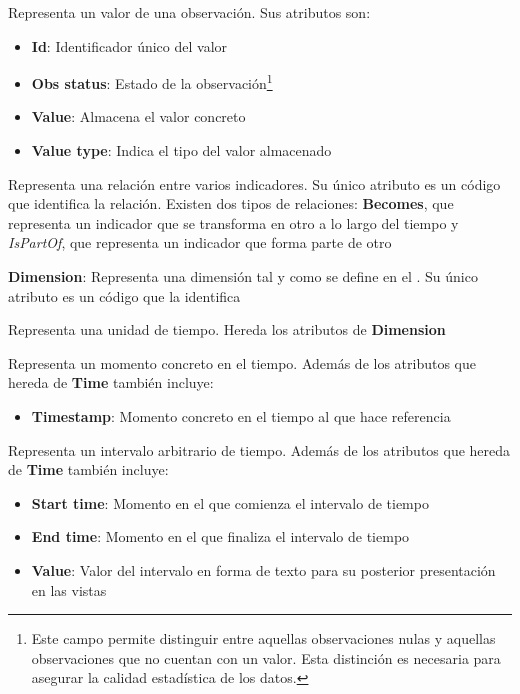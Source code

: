 \begin{description}
\begin{itemize}
		\end{itemize}
	\item[Value]  Representa un valor de una observación.  Sus atributos son:
		\begin{itemize}
			\item \textbf{Id}:  Identificador único del valor
			\item \textbf{Obs status}:  Estado de la observación\footnote{Este campo permite distinguir entre aquellas observaciones nulas y aquellas observaciones que no cuentan con un valor.  Esta distinción es necesaria para asegurar la calidad estadística de los datos.}
			\item \textbf{Value}:  Almacena el valor concreto
			\item \textbf{Value type}:  Indica el tipo del valor almacenado
		\end{itemize}
	\item[IndicatorRelationship]  Representa una relación entre varios indicadores.  Su único atributo es un código que identifica la relación.  Existen dos tipos de relaciones:  \textbf{Becomes}, que representa un indicador que se transforma en otro a lo largo del tiempo y \textit{IsPartOf}, que representa un indicador que forma parte de otro
	\item \textbf{Dimension}:  Representa una dimensión tal y como se define en el .  Su único atributo es un código que la identifica
	\item[Time]  Representa una unidad de tiempo.  Hereda los atributos de \textbf{Dimension}
	\item[Instant]  Representa un momento concreto en el tiempo.  Además de los atributos que hereda de \textbf{Time} también incluye:
	\begin{itemize}
		\item \textbf{Timestamp}:  Momento concreto en el tiempo al que hace referencia
	\end{itemize}
	\item[Interval]  Representa un intervalo arbitrario de tiempo.  Además de los atributos que hereda de \textbf{Time} también incluye:
	\begin{itemize}
		\item \textbf{Start time}:  Momento en el que comienza el intervalo de tiempo
		\item \textbf{End time}:  Momento en el que finaliza el intervalo de tiempo
		\item \textbf{Value}:  Valor del intervalo en forma de texto para su posterior presentación en las vistas

\end{itemize}
\end{description}
